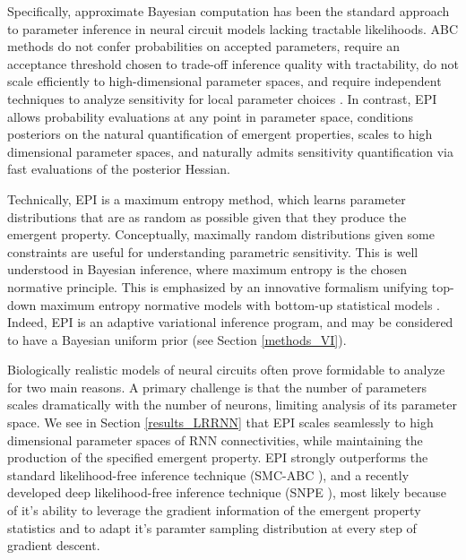 \documentclass[11pt]{article}
\begin{document}
Specifically, approximate Bayesian computation \cite{beaumont2002approximate, marjoram2003markov, sisson2007sequential} has been the standard approach to parameter inference in neural circuit models lacking tractable likelihoods.
ABC methods do not confer probabilities on accepted parameters, require an acceptance threshold chosen to trade-off inference quality with tractability, do not scale efficiently to high-dimensional parameter spaces, and require independent techniques to analyze sensitivity for local parameter choices \cite{sisson2018handbook}.
In contrast, EPI allows probability evaluations at any point in parameter space, conditions posteriors on the natural quantification of emergent properties, scales to high dimensional parameter spaces, and naturally admits sensitivity quantification via fast evaluations of the posterior Hessian.

Technically, EPI is a maximum entropy method, which learns parameter distributions that are as random as possible given that they produce the emergent property.
Conceptually, maximally random distributions given some constraints are useful for understanding parametric sensitivity.
This is well understood in Bayesian inference, where maximum entropy is the chosen normative principle.
This is emphasized by an innovative formalism unifying top-down maximum entropy normative models with bottom-up statistical models \cite{mlynarski2020statistical}.
Indeed, EPI is an adaptive variational inference program, and may be considered to have a Bayesian uniform prior (see Section \ref{methods_VI}).



Biologically realistic models of neural circuits often prove formidable to analyze for two main reasons.
A primary challenge is that the number of parameters scales dramatically with the number of neurons, limiting analysis of its parameter space.
We see in Section \ref{results_LRRNN} that EPI scales seamlessly to high dimensional parameter spaces of RNN connectivities, while maintaining the production of the specified emergent property.
EPI strongly outperforms the standard likelihood-free inference technique (SMC-ABC \cite{sisson2007sequential}), and a recently developed deep likelihood-free inference technique (SNPE \cite{gonccalves2019training}), most likely because of it's ability to leverage the gradient information of the emergent property statistics and to adapt it's paramter sampling distribution at every step of gradient descent.
\end{document}
